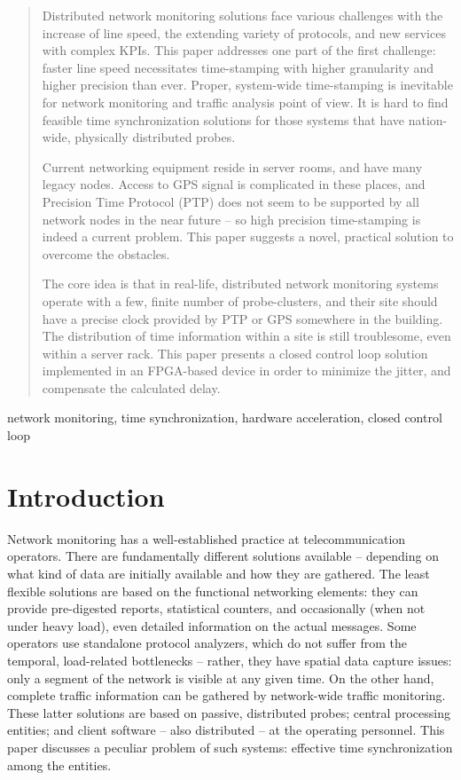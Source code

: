 \documentclass[journal]{IEEEtran}
\begin{document}
\begin{abstract}
    \boldmath
    Distributed network monitoring solutions face various challenges with the increase of line speed, the extending variety of protocols, and new services with complex KPIs. This paper addresses one part of the first challenge: faster line speed necessitates time-stamping with higher granularity and higher precision than ever. Proper, system-wide time-stamping is inevitable for network monitoring and traffic analysis point of view. It is hard to find feasible time synchronization solutions for those systems that have nation-wide, physically distributed probes.
    
    Current networking equipment reside in server rooms, and have many legacy nodes. Access to GPS signal is complicated in these places, and Precision Time Protocol (PTP) does not seem to be supported by all network nodes in the near future -- so high precision time-stamping is indeed a current problem. This paper suggests a novel, practical solution to overcome the obstacles. 
    
    The core idea is that in real-life, distributed network monitoring systems operate with a few, finite number of probe-clusters, and their site should have a precise clock provided by PTP or GPS somewhere in the building. The distribution of time information within a site is still troublesome, even within a server rack. This paper presents a closed control loop solution implemented in an FPGA-based device in order to minimize the jitter, and compensate the calculated delay.
    
\end{abstract}

\begin{IEEEkeywords}
    network monitoring, time synchronization, hardware acceleration, closed control loop 
\end{IEEEkeywords}

\section{Introduction}\label{sec:Intro}

Network monitoring has a well-established practice at telecommunication operators. There are fundamentally different solutions available -- depending on what kind of data are initially available and how they are gathered. The least flexible solutions are based on the functional networking elements: they can provide pre-digested reports, statistical counters, and occasionally (when not under heavy load), even detailed information on the actual messages. Some operators use standalone protocol analyzers, which do not suffer from the temporal, load-related bottlenecks -- rather, they have spatial data capture issues: only a segment of the network is visible at any given time. On the other hand, complete traffic information can be gathered by network-wide traffic monitoring. These latter solutions are based on passive, distributed probes; central processing entities; and client software -- also distributed -- at the operating personnel. This paper discusses a peculiar problem of such systems: effective time synchronization among the entities.
\end{document}
